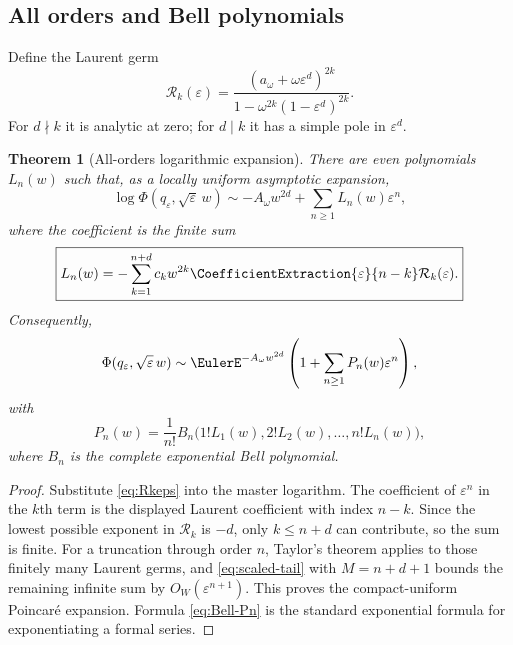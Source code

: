 \documentclass[11pt]{article}
\newtheorem{theorem}{Theorem}[section]
\theoremstyle{definition}
\newcommand{\eps}{\varepsilon}
\begin{document}
\subsection{All orders and Bell polynomials}

Define the Laurent germ
\begin{equation}
 \mathcal R_k(\eps)
 =\frac{(a_\omega+\omega\eps^d)^{2k}}
 {1-\omega^{2k}(1-\eps^d)^{2k}}.
 \label{eq:Rkeps}
\end{equation}
For $d\nmid k$ it is analytic at zero; for $d\mid k$ it has a simple pole in $\eps^d$.

\begin{theorem}[All-orders logarithmic expansion]
There are even polynomials $L_n(w)$ such that, as a locally uniform asymptotic expansion,
\begin{equation}
 \log\Phi(q_\eps,\sqrt\eps\,w)
 \sim -A_\omega w^{2d}+\sum_{n\ge1}L_n(w)\eps^n,
 \label{eq:all-log}
\end{equation}
where the coefficient is the finite sum
\begin{equation}
 \boxed{
 L_n(w)=-\sum_{k=1}^{n+d}c_kw^{2k}
 \CoefficientExtraction{\eps}{n-k}\mathcal R_k(\eps).}
 \label{eq:Ln}
\end{equation}
Consequently,
\begin{equation}
 \Phi(q_\eps,\sqrt\eps\,w)
 \sim \EulerE^{-A_\omega w^{2d}}
 \left(1+\sum_{n\ge1}P_n(w)\eps^n\right),
 \label{eq:all-Phi}
\end{equation}
with
\begin{equation}
 \boxed{
 P_n(w)=\frac1{n!}
 B_n\bigl(1!L_1(w),2!L_2(w),\dots,n!L_n(w)\bigr),}
 \label{eq:Bell-Pn}
\end{equation}
where $B_n$ is the complete exponential Bell polynomial.
\end{theorem}

\begin{proof}
Substitute \cref{eq:Rkeps} into the master logarithm.  The coefficient of $\eps^n$ in the $k$th term is the displayed Laurent coefficient with index $n-k$.  Since the lowest possible exponent in $\mathcal R_k$ is $-d$, only $k\le n+d$ can contribute, so the sum is finite.  For a truncation through order $n$, Taylor's theorem applies to those finitely many Laurent germs, and \cref{eq:scaled-tail} with $M=n+d+1$ bounds the remaining infinite sum by $O_W(\eps^{n+1})$.  This proves the compact-uniform Poincar\'e expansion.  Formula \cref{eq:Bell-Pn} is the standard exponential formula for exponentiating a formal series.
\end{proof}
\end{document}
